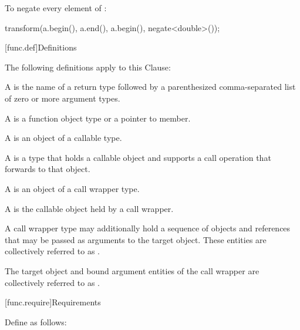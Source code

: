 \pnum
\begin{example}
To negate every element of :

\begin{codeblock}
transform(a.begin(), a.end(), a.begin(), negate<double>());
\end{codeblock}

\end{example}

[func.def]{Definitions}

\pnum
The following definitions apply to this Clause:

\pnum
A  is the name of a return type followed by a
parenthesized comma-separated list of zero or more argument types.

\pnum
A  is a function object type or a pointer to member.

\pnum
A  is an object of a callable type.

\pnum
A  is a type that holds a callable object
and supports a call operation that forwards to that object.

\pnum
A  is an object of a call wrapper type.

\pnum
A  is the callable object held by a call wrapper.

\pnum
A call wrapper type may additionally hold
a sequence of objects and references
that may be passed as arguments to the target object.
These entities are collectively referred to
as .

\pnum
The target object and bound argument entities of the call wrapper are
collectively referred to as .

[func.require]{Requirements}

\pnum
{}%
Define  as follows:

